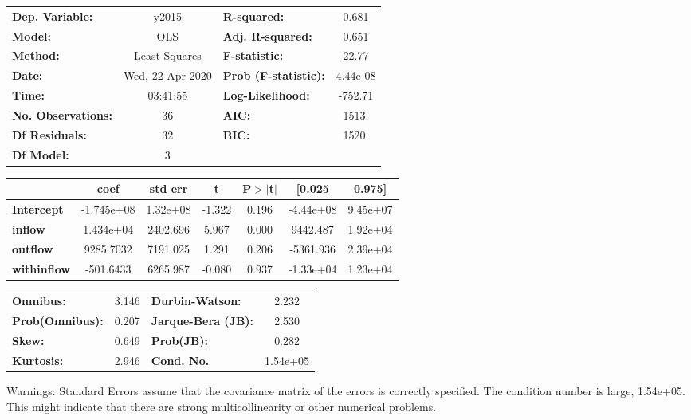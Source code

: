 \begin{center}
\begin{tabular}{lclc}
\toprule
\textbf{Dep. Variable:}    &      y2015       & \textbf{  R-squared:         } &     0.681   \\
\textbf{Model:}            &       OLS        & \textbf{  Adj. R-squared:    } &     0.651   \\
\textbf{Method:}           &  Least Squares   & \textbf{  F-statistic:       } &     22.77   \\
\textbf{Date:}             & Wed, 22 Apr 2020 & \textbf{  Prob (F-statistic):} &  4.44e-08   \\
\textbf{Time:}             &     03:41:55     & \textbf{  Log-Likelihood:    } &   -752.71   \\
\textbf{No. Observations:} &          36      & \textbf{  AIC:               } &     1513.   \\
\textbf{Df Residuals:}     &          32      & \textbf{  BIC:               } &     1520.   \\
\textbf{Df Model:}         &           3      & \textbf{                     } &             \\
\bottomrule
\end{tabular}
\begin{tabular}{lcccccc}
                    & \textbf{coef} & \textbf{std err} & \textbf{t} & \textbf{P$> |$t$|$} & \textbf{[0.025} & \textbf{0.975]}  \\
\midrule
\textbf{Intercept}  &   -1.745e+08  &     1.32e+08     &    -1.322  &         0.196        &    -4.44e+08    &     9.45e+07     \\
\textbf{inflow}     &    1.434e+04  &     2402.696     &     5.967  &         0.000        &     9442.487    &     1.92e+04     \\
\textbf{outflow}    &    9285.7032  &     7191.025     &     1.291  &         0.206        &    -5361.936    &     2.39e+04     \\
\textbf{withinflow} &    -501.6433  &     6265.987     &    -0.080  &         0.937        &    -1.33e+04    &     1.23e+04     \\
\bottomrule
\end{tabular}
\begin{tabular}{lclc}
\textbf{Omnibus:}       &  3.146 & \textbf{  Durbin-Watson:     } &    2.232  \\
\textbf{Prob(Omnibus):} &  0.207 & \textbf{  Jarque-Bera (JB):  } &    2.530  \\
\textbf{Skew:}          &  0.649 & \textbf{  Prob(JB):          } &    0.282  \\
\textbf{Kurtosis:}      &  2.946 & \textbf{  Cond. No.          } & 1.54e+05  \\
\bottomrule
\end{tabular}
\end{center}

Warnings: \newline
 [1] Standard Errors assume that the covariance matrix of the errors is correctly specified. \newline
 [2] The condition number is large, 1.54e+05. This might indicate that there are \newline
 strong multicollinearity or other numerical problems.